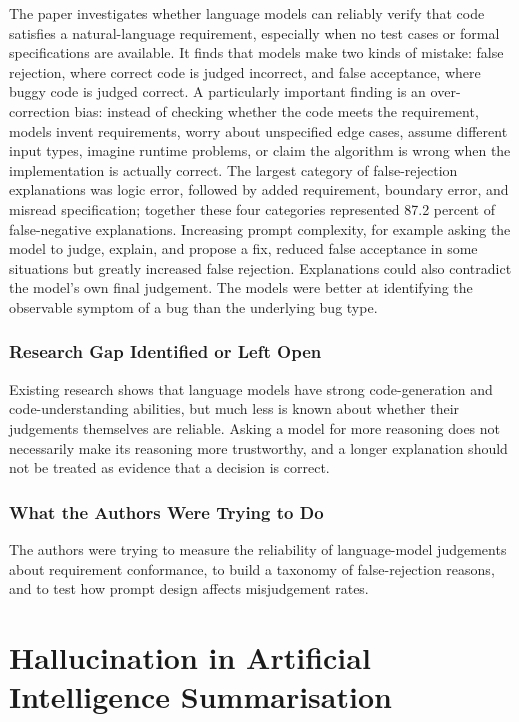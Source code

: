 \documentclass[11pt,a4paper]{report}
\begin{document}
The paper investigates whether language models can reliably verify that
code satisfies a natural-language requirement, especially when no test
cases or formal specifications are available. It finds that models make
two kinds of mistake: false rejection, where correct code is judged
incorrect, and false acceptance, where buggy code is judged correct. A
particularly important finding is an over-correction bias: instead of
checking whether the code meets the requirement, models invent
requirements, worry about unspecified edge cases, assume different
input types, imagine runtime problems, or claim the algorithm is wrong
when the implementation is actually correct. The largest category of
false-rejection explanations was logic error, followed by added
requirement, boundary error, and misread specification; together these
four categories represented 87.2 percent of false-negative
explanations. Increasing prompt complexity, for example asking the
model to judge, explain, and propose a fix, reduced false acceptance in
some situations but greatly increased false rejection. Explanations
could also contradict the model's own final judgement. The models were
better at identifying the observable symptom of a bug than the
underlying bug type.

\subsubsection{Research Gap Identified or Left Open}

Existing research shows that language models have strong
code-generation and code-understanding abilities, but much less is
known about whether their judgements themselves are reliable. Asking a
model for more reasoning does not necessarily make its reasoning more
trustworthy, and a longer explanation should not be treated as evidence
that a decision is correct.

\subsubsection{What the Authors Were Trying to Do}

The authors were trying to measure the reliability of language-model
judgements about requirement conformance, to build a taxonomy of
false-rejection reasons, and to test how prompt design affects
misjudgement rates.

\section{Hallucination in Artificial Intelligence Summarisation}
\end{document}
